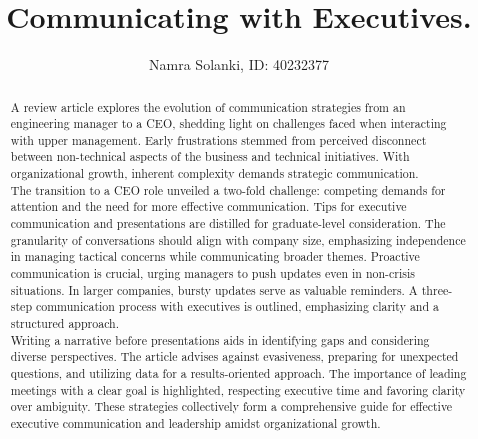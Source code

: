 \documentclass[runningheads]{llncs}
\begin{document}
%
\title{Communicating with Executives.}
%
%
\author{Namra Solanki, ID: 40232377}
%
%
%
\maketitle              %
%
\begin{abstract}
A review article explores the evolution of communication strategies from an engineering manager to a CEO, shedding light on challenges faced when interacting with upper management. Early frustrations stemmed from perceived disconnect between non-technical aspects of the business and technical initiatives. With organizational growth, inherent complexity demands strategic communication. \\

The transition to a CEO role unveiled a two-fold challenge: competing demands for attention and the need for more effective communication. Tips for executive communication and presentations are distilled for graduate-level consideration. The granularity of conversations should align with company size, emphasizing independence in managing tactical concerns while communicating broader themes. Proactive communication is crucial, urging managers to push updates even in non-crisis situations. In larger companies, bursty updates serve as valuable reminders. A three-step communication process with executives is outlined, emphasizing clarity and a structured approach. \\

Writing a narrative before presentations aids in identifying gaps and considering diverse perspectives. The article advises against evasiveness, preparing for unexpected questions, and utilizing data for a results-oriented approach. The importance of leading meetings with a clear goal is highlighted, respecting executive time and favoring clarity over ambiguity. These strategies collectively form a comprehensive guide for effective executive communication and leadership amidst organizational growth.

\end{abstract}
%
%
%
\end{document}
